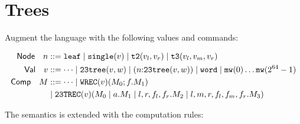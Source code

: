 \newcommand{\leaf}{\ensuremath{\mathtt{leaf}}}
\newcommand{\single}[1]{\ensuremath{\mathtt{single}(#1)}}
\newcommand{\ttwo}[2]{\ensuremath{\mathtt{t2}(#1,#2)}}
\newcommand{\tthree}[3]{\ensuremath{\mathtt{t3}(#1,#2,#3)}}
\newcommand{\ttrec}[8]{\mathtt{23TREC}(#1)(#2 \mid #3.#4 \mid #5.#6 \mid #7.#8)}
\newcommand{\tttree}[2]{\ensuremath{\mathtt{23tree}(#1,#2)}}
\newcommand{\word}{\mathtt{word}}
\newcommand{\mw}[1]{\mathtt{mw}(#1)}
\newcommand{\wrec}[4]{\mathtt{WREC}(#1)(#2; #3.#4)}
\newcommand{\join}{\mathsf{join}}
\newcommand{\cmp}{\mathsf{cmp}}
\newcommand{\ifnat}[3]{\mathsf{if}(#1;#2;#3)}
\newcommand{\const}[1]{\lam{\_}{\_}{#1}}
\newcommand{\eq}{\mathsf{eq}}
\newcommand{\macro}{@\!\!=}
\section{Trees}

Augment the language with the following values and commands:

\begin{align*}
    \mathsf{Node} \quad n &::= 
         \leaf
    \mid \single{v}
    \mid \ttwo{v_l}{v_r}
    \mid \tthree{v_l}{v_m}{v_r}\\
    \mathsf{Val} \quad v &::= \dots
    \mid \tttree{v}{w}
    \mid (\isOf{n}{\tttree{v}{w}})
    \mid \word
    \mid \mw{0} \dots \mw{2^{64}-1}\\
    \mathsf{Comp} \quad M &::= 
    \dots
    \mid \wrec{v}{M_0}{f}{M_1}\\
    &\mid \ttrec{v}{M_0}{a}{M_1}{l,r,f_l,f_r}{M_2}{l,m,r,f_l,f_m,f_r}{M_3}\\
\end{align*}

The semantics is extended with the computation rules:

